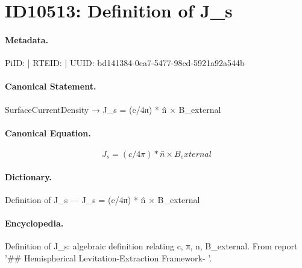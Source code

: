 \section*{ID10513: Definition of J\_s}
\paragraph{Metadata.}
PiID:  | RTEID:  | UUID: bd141384-0ca7-5477-98cd-5921a92a544b

\paragraph{Canonical Statement.}
SurfaceCurrentDensity → J\_s = (c/4π) * n̂ × B\_external

\paragraph{Canonical Equation.}
\[
J_s = (c/4π) * n̂ × B_external
\]

\paragraph{Dictionary.}
Definition of J\_s — J\_s = (c/4π) * n̂ × B\_external

\paragraph{Encyclopedia.}
Definition of J\_s: algebraic definition relating c, π, n, B\_external. From report '\#\# Hemispherical Levitation-Extraction Framework- '.
